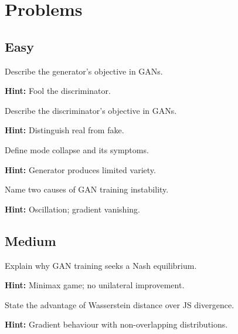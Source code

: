 
\section*{Problems}

\subsection*{Easy}

\begin{problem}
Describe the generator's objective in GANs.

\textbf{Hint:} Fool the discriminator.
\end{problem}

\begin{problem}
Describe the discriminator's objective in GANs.

\textbf{Hint:} Distinguish real from fake.
\end{problem}

\begin{problem}
Define mode collapse and its symptoms.

\textbf{Hint:} Generator produces limited variety.
\end{problem}

\begin{problem}
Name two causes of GAN training instability.

\textbf{Hint:} Oscillation; gradient vanishing.
\end{problem}

\subsection*{Medium}

\begin{problem}
Explain why GAN training seeks a Nash equilibrium.

\textbf{Hint:} Minimax game; no unilateral improvement.
\end{problem}

\begin{problem}
State the advantage of Wasserstein distance over JS divergence.

\textbf{Hint:} Gradient behaviour with non-overlapping distributions.
\end{problem}

